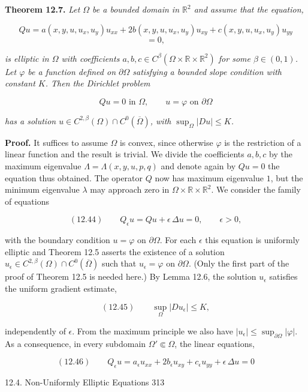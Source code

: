 {\bf Theorem 12.7.} \emph{Let $\Omega$ be a bounded domain in $\mathbb{R}^2$ and assume that the equation,}

\[
Qu=a(x,y,u,u_x,u_y)u_{xx}+2b(x,y,u,u_x,u_y)u_{xy}+c(x,y,u,u_x,u_y)u_{yy}
\]
\[
=0,
\]

\emph{is elliptic in $\Omega$ with coefficients $a, b, c \in C^\beta(\Omega\times \mathbb{R}\times \mathbb{R}^2)$ for some $\beta \in (0,1)$. Let $\varphi$
be a function defined on $\partial\Omega$ satisfying a bounded slope condition with constant $K$.
Then the Dirichlet problem}

\[
Qu=0 \text{ in } \Omega,\qquad u=\varphi \text{ on } \partial\Omega
\]

\emph{has a solution $u\in C^{2,\beta}(\Omega)\cap C^0(\overline{\Omega})$, with $\sup_\Omega |Du|\le K$.}

{\bf Proof.} It suffices to assume $\Omega$ is convex, since otherwise $\varphi$ is the restriction of a
linear function and the result is trivial. We divide the coefficients $a, b, c$ by the
maximum eigenvalue $\Lambda=\Lambda(x,y,u,p,q)$ and denote again by $Qu=0$ the equation
thus obtained. The operator $Q$ now has maximum eigenvalue $1$, but the minimum
eigenvalue $\lambda$ may approach zero in $\Omega\times \mathbb{R}\times \mathbb{R}^2$. We consider the family of equations

\[
(12.44)\qquad Q_\epsilon u=Qu+\epsilon \,\Delta u=0,\qquad \epsilon>0,
\]

with the boundary condition $u=\varphi$ on $\partial\Omega$. For each $\epsilon$ this equation is uniformly
elliptic and Theorem 12.5 asserts the existence of a solution $u_\epsilon\in C^{2,\beta}(\Omega)\cap C^0(\overline{\Omega})$
such that $u_\epsilon=\varphi$ on $\partial\Omega$. (Only the first part of the proof of Theorem 12.5 is needed
here.) By Lemma 12.6, the solution $u_\epsilon$ satisfies the uniform gradient estimate,

\[
(12.45)\qquad \sup_\Omega |Du_\epsilon|\le K,
\]

independently of $\epsilon$. From the maximum principle we also have $|u_\epsilon|\le \sup_{\partial\Omega} |\varphi|$.
As a consequence, in every subdomain $\Omega' \Subset \Omega$, the linear equations,

\[
(12.46)\qquad Q_\epsilon u=a_\epsilon u_{xx}+2b_\epsilon u_{xy}+c_\epsilon u_{yy}+\epsilon\,\Delta u=0
\]


12.4. Non-Uniformly Elliptic Equations \hfill 313

